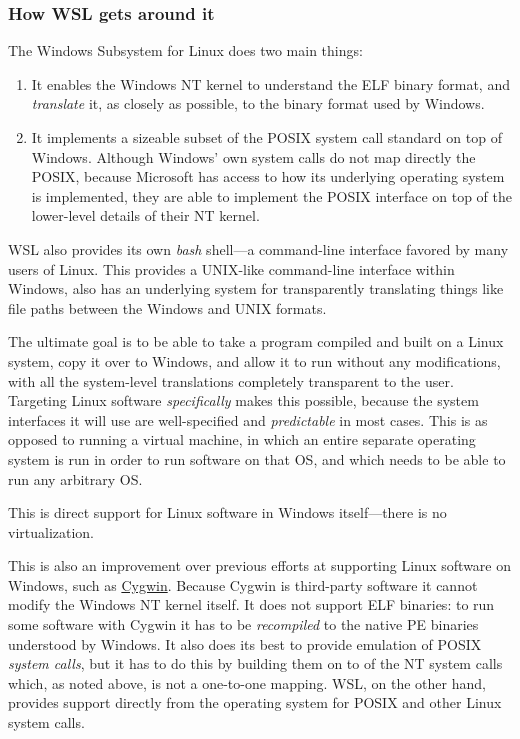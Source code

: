 \documentclass{deliverablereport}
\begin{document}
\subsubsection{How WSL gets around it}

The Windows Subsystem for Linux does two main things:

\begin{enumerate}
\item It enables the Windows NT kernel to understand the ELF binary
  format, and \emph{translate} it, as closely as possible, to the
  binary format used by Windows.
\item It implements a sizeable subset of the POSIX system call
  standard on top of Windows.  Although Windows' own system calls do
  not map directly the POSIX, because Microsoft has access to how its
  underlying operating system is implemented, they are able to
  implement the POSIX interface on top of the lower-level details of
  their NT kernel.
\end{enumerate}

WSL also provides its own \emph{bash} shell---a command-line interface
favored by many users of Linux.  This provides a UNIX-like
command-line interface within Windows, also has an underlying system
for transparently translating things like file paths between the
Windows and UNIX formats.

The ultimate goal is to be able to take a program compiled and built
on a Linux system, copy it over to Windows, and allow it to run
without any modifications, with all the system-level translations
completely transparent to the user.  Targeting Linux software
\emph{specifically} makes this possible, because the system interfaces
it will use are well-specified and \emph{predictable} in most cases.  This
is as opposed to running a virtual machine, in which an entire
separate operating system is run in order to run software on that OS,
and which needs to be able to run any arbitrary OS.

This is direct support for Linux software in Windows itself---there is
no virtualization.

This is also an improvement over previous efforts at supporting Linux
software on Windows, such as \href{https://www.cygwin.com/}{Cygwin}.
Because Cygwin is third-party software it cannot modify the Windows NT
kernel itself.  It does not support ELF binaries: to run some software
with Cygwin it has to be \emph{recompiled} to the native PE binaries
understood by Windows.  It also does its best to provide emulation of
POSIX \emph{system calls}, but it has to do this by building them on
to of the NT system calls which, as noted above, is not a one-to-one
mapping.  WSL, on the other hand, provides support directly from the
operating system for POSIX and other Linux system calls.
\end{document}
